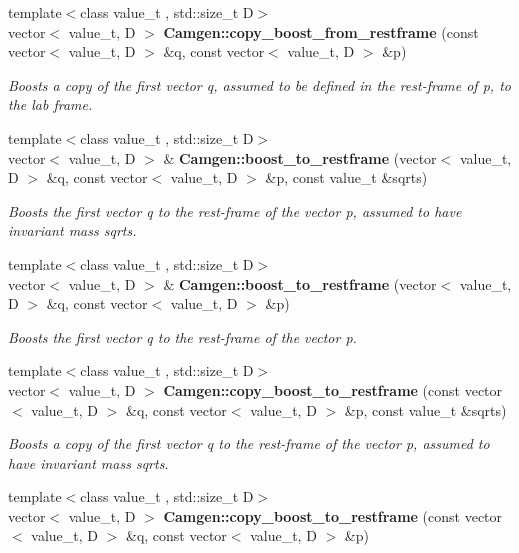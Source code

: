 \begin{DoxyCompactItemize}
{\footnotesize template$<$class value\-\_\-t , std\-::size\-\_\-t D$>$ }\\vector$<$ value\-\_\-t, D $>$ {\bfseries Camgen\-::copy\-\_\-boost\-\_\-from\-\_\-restframe} (const vector$<$ value\-\_\-t, D $>$ \&q, const vector$<$ value\-\_\-t, D $>$ \&p)
\begin{DoxyCompactList}\small\item\em Boosts a copy of the first vector q, assumed to be defined in the rest-\/frame of p, to the lab frame. \end{DoxyCompactList}\item 
{\footnotesize template$<$class value\-\_\-t , std\-::size\-\_\-t D$>$ }\\vector$<$ value\-\_\-t, D $>$ \& {\bfseries Camgen\-::boost\-\_\-to\-\_\-restframe} (vector$<$ value\-\_\-t, D $>$ \&q, const vector$<$ value\-\_\-t, D $>$ \&p, const value\-\_\-t \&sqrts)
\begin{DoxyCompactList}\small\item\em Boosts the first vector q to the rest-\/frame of the vector p, assumed to have invariant mass sqrts. \end{DoxyCompactList}\item 
\hypertarget{a00849_abb5eb6c49b5a2ff87a16dc23728e779b}{{\footnotesize template$<$class value\-\_\-t , std\-::size\-\_\-t D$>$ }\\vector$<$ value\-\_\-t, D $>$ \& {\bfseries Camgen\-::boost\-\_\-to\-\_\-restframe} (vector$<$ value\-\_\-t, D $>$ \&q, const vector$<$ value\-\_\-t, D $>$ \&p)}\label{a00849_abb5eb6c49b5a2ff87a16dc23728e779b}

\begin{DoxyCompactList}\small\item\em Boosts the first vector q to the rest-\/frame of the vector p. \end{DoxyCompactList}\item 
{\footnotesize template$<$class value\-\_\-t , std\-::size\-\_\-t D$>$ }\\vector$<$ value\-\_\-t, D $>$ {\bfseries Camgen\-::copy\-\_\-boost\-\_\-to\-\_\-restframe} (const vector$<$ value\-\_\-t, D $>$ \&q, const vector$<$ value\-\_\-t, D $>$ \&p, const value\-\_\-t \&sqrts)
\begin{DoxyCompactList}\small\item\em Boosts a copy of the first vector q to the rest-\/frame of the vector p, assumed to have invariant mass sqrts. \end{DoxyCompactList}\item 
\hypertarget{a00849_a7809ff644ef4a5fe3693137967664e99}{{\footnotesize template$<$class value\-\_\-t , std\-::size\-\_\-t D$>$ }\\vector$<$ value\-\_\-t, D $>$ {\bfseries Camgen\-::copy\-\_\-boost\-\_\-to\-\_\-restframe} (const vector$<$ value\-\_\-t, D $>$ \&q, const vector$<$ value\-\_\-t, D $>$ \&p)}\label{a00849_a7809ff644ef4a5fe3693137967664e99}


\end{DoxyCompactItemize}
